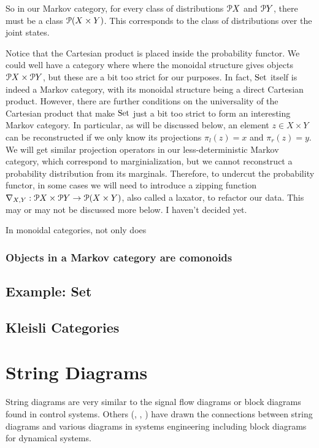 So in our Markov category, for every class of distributions $\mathcal{P} X$ and $\mathcal{P} Y$, there must be a class $\mathcal{P} (X\times Y)$.
This corresponds to the class of distributions over the joint states.

Notice that the Cartesian product is placed inside the probability functor.
We could well have a category where where the monoidal structure gives objects $\mathcal{P} X \times \mathcal{P} Y$, but these are a bit too strict for our purposes.
In fact, $\mathrm{Set}$ itself is indeed a Markov category, with its monoidal structure being a direct Cartesian product.
However, there are further conditions on the universality of the Cartesian product that make $\mathrm{Set}$ just a bit too strict to form an interesting Markov category.
In particular, as will be discussed below, an element $z\in X\times Y$ can be reconstructed if we only know its projections $\pi_l(z) = x$ and $\pi_r(z) = y$.
We will get similar projection operators in our less-deterministic Markov category, which correspond to marginialization, but we cannot reconstruct a probability distribution from its marginals.
Therefore, to undercut the probability functor, in some cases we will need to introduce a zipping function $\nabla_{X,Y} : \mathcal{P} X\times \mathcal{P} Y\rightarrow \mathcal{P}(X\times Y)$, also called a laxator, to refactor our data.
This may or may not be discussed more below. I haven't decided yet.

In monoidal categories, not only does 

\subsubsection{Objects in a Markov category are comonoids}

\subsection{Example: Set}
\subsection{Kleisli Categories}

\section{String Diagrams}

String diagrams are very similar to the signal flow diagrams or block diagrams found in control systems.
Others (\cite{baez2015control}, \cite{fong2016thesis}, \cite{fong2016dynamicalsystems}) have drawn the connections between string diagrams and various diagrams in systems engineering including block diagrams for dynamical systems.

